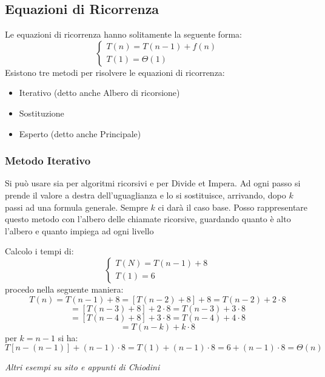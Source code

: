 \documentclass[a4paper,12pt, oneside]{book}
\begin{document}
\begin{shaded}
  \subsection{Equazioni di Ricorrenza}
  Le equazioni di ricorrenza hanno solitamente la seguente forma:
  $$\begin{cases}
    T(n)=T(n-1)+f(n) \\
    T(1)=\Theta(1)
  \end{cases}$$
  Esistono tre metodi per risolvere le equazioni di ricorrenza:
  \begin{itemize}
    \item Iterativo (detto anche Albero di ricorsione)
    \item Sostituzione
    \item Esperto (detto anche Principale)
  \end{itemize}
  \subsubsection{Metodo Iterativo}
  Si può usare sia per algoritmi ricorsivi e per Divide et Impera.
  Ad ogni passo si prende il valore a destra dell'uguaglianza e
  lo si sostituisce, arrivando, dopo $k$ passi ad una formula
  generale. Sempre $k$ ci darà il caso base. Posso rappresentare
  questo  metodo con l'albero delle chiamate ricorsive,
  guardando quanto è alto l'albero e quanto impiega ad ogni livello
  \begin{esempio}
    Calcolo i tempi di:
    $$\begin{cases}
      T(N)=T(n-1)+8 \\
      T(1)=6
    \end{cases}$$
    procedo nella seguente maniera:
    $$T(n)=T(n-1)+8=[T(n-2)+8]+8=T(n-2)+2\cdot 8$$
    $$=[T(n-3)+8]+2\cdot 8= T(n-3)+3\cdot 8$$
    $$=[T(n-4)+8]+3\cdot 8=T(n-4)+4\cdot 8$$
    $$=T(n-k)+k\cdot 8$$
    per $k=n-1$ si ha:
    $$T[n-(n-1)]+(n-1)\cdot 8=T(1)+(n-1)\cdot 8=6+(n-1)\cdot 8=\Theta(n)$$
  \end{esempio}
  \textit{Altri esempi su sito e appunti di Chiodini}

\end{shaded}
\end{document}
